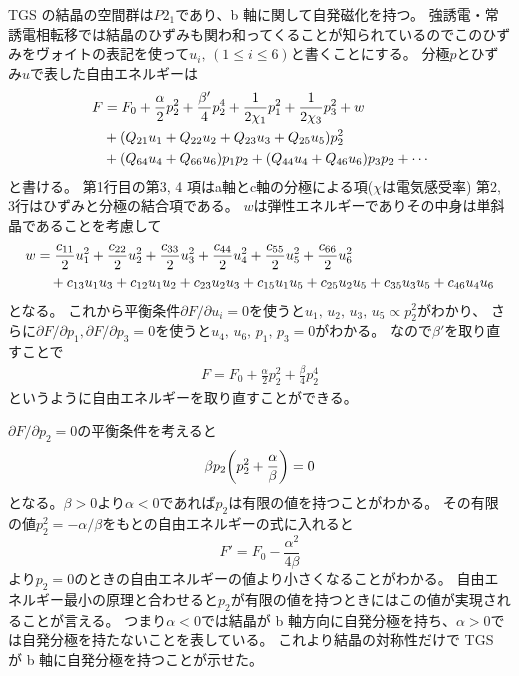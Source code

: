 \documentclass[9pt,dvipdfmx,a4paper]{jsarticle}
\begin{document}
TGS の結晶の空間群は\(P2_1\)であり、b 軸に関して自発磁化を持つ。
強誘電・常誘電相転移では結晶のひずみも関わ和ってくることが知られているのでこのひずみをヴォイトの表記を使って\(u_i,\,(1\leq i \leq6)\)と書くことにする。
分極\(p\)とひずみ\(u\)で表した自由エネルギーは
\begin{align}
    F
    &= F_0 + \frac{\alpha}{2}p_2^2 + \frac{\beta'}{4}p_2^4+\frac{1}{2\chi_1}p_1^2+\frac{1}{2\chi_3}p_3^2 + w \notag\\
    &+(Q_{21}u_1+Q_{22}u_2+Q_{23}u_3 + Q_{25}u_5)p_2^2 \notag\\
    &+(Q_{64}u_4+Q_{66}u_6)p_1 p_2 +(Q_{44}u_4+Q_{46}u_6)p_3 p_2+\cdots
\end{align}
と書ける\cite{ishibashi}。
第1行目の第3, 4 項はa軸とc軸の分極による項(\(\chi\)は電気感受率)
第2, 3行はひずみと分極の結合項である。
\(w\)は弾性エネルギーでありその中身は単斜晶であることを考慮して
\begin{align}
    w
    &= \frac{c_{11}}{2}u_1^2 + \frac{c_{22}}{2}u_2^2 + \frac{c_{33}}{2}u_3^2 + \frac{c_{44}}{2}u_4^2 + \frac{c_{55}}{2}u_5^2 + \frac{c_{66}}{2}u_6^2 \notag\\
    &\quad + c_{13}u_1u_3 + c_{12}u_1u_2 + c_{23}u_2u_3 +c_{15}u_1u_5 +c_{25}u_2u_5 +c_{35}u_3u_5 +c_{46}u_4u_6
\end{align}
となる。
これから平衡条件\(\partial F/ \partial u_i = 0\)を使うと\(u_1,\,u_2,\,u_3,\,u_5 \propto p_2^2\)がわかり、
さらに\(\partial F/ \partial p_1, \partial F/ \partial p_3 = 0\)を使うと\(u_4,\,u_6,\,p_1,\,p_3 = 0\)がわかる。
なので\(\beta'\)を取り直すことで
\begin{align}
    F = F_0 + \frac{\alpha}{2}p_2^2 + \frac{\beta}{4}p_2^4
\end{align}
というように自由エネルギーを取り直すことができる。

\(\partial F/ \partial p_2 = 0\)の平衡条件を考えると
\begin{align}
    \beta p_2 \qty(p_2^2+\frac{\alpha}{\beta})=0
\end{align}
となる。\(\beta > 0\)より\(\alpha<0\)であれば\(p_2\)は有限の値を持つことがわかる。
その有限の値\(p_2^2 = -\alpha/\beta\)をもとの自由エネルギーの式に入れると
\begin{equation}
    F' = F_0 -\frac{\alpha^2}{4\beta}
\end{equation}
より\(p_2=0\)のときの自由エネルギーの値より小さくなることがわかる。
自由エネルギー最小の原理と合わせると\(p_2\)が有限の値を持つときにはこの値が実現されることが言える。
つまり\(\alpha<0\)では結晶が b 軸方向に自発分極を持ち、\(\alpha>0\)では自発分極を持たないことを表している。
これより結晶の対称性だけで TGS が b 軸に自発分極を持つことが示せた。
\end{document}
